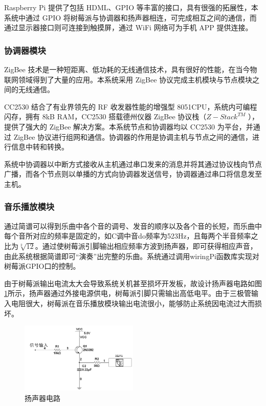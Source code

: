 \begin{spacing}{1.2}
    Raspberry Pi 提供了包括 HDML、GPIO 等丰富的接口，具有很强的拓展性，本系统中通过 GPIO 将树莓派与协调器和扬声器相连，可完成相互之间的通信，而通过显示器接口则可连接到触摸屏，通过 WiFi 网络可为手机 APP 提供连接。

    \subsubsection{协调器模块}
    ZigBee 技术是一种短距离、低功耗的无线通信技术，具有很好的性能，在当今物联网领域得到了大量的应用\supercite{13}。本系统采用 ZigBee 协议完成主机模块与节点模块之间的无线通信。

    CC2530 结合了有业界领先的 RF 收发器性能的增强型 8051CPU，系统内可编程闪存，拥有 8kB RAM，CC2530 搭载德州仪器 ZigBee 协议栈（$Z-Stack^{TM}$ ），提供了强大的 ZigBee 解决方案。本系统节点和协调器均以 CC2530 为平台，并通过 ZigBee 协议进行组网和通信\supercite{14}。协调器的作用是协调主机与节点之间的通信，进行信息中转和转换。

    系统中协调器以中断方式接收从主机通过串口发来的消息并将其通过协议栈向节点广播，而各个节点则以单播的方式向协调器发送信号，协调器通过串口将信息发至主机。


    \subsubsection{音乐播放模块}
    通过简谱可以得到乐曲中各个音的调号、发音的顺序以及各个音的长短，而乐曲中每个音所对应的频率是固定的，如C调中音do频率为523Hz，且每两个半音频率之比为$\sqrt[2]{12}$。通过使树莓派引脚输出相应频率方波到扬声器，即可获得相应声音，由此系统根据简谱即可“演奏”出完整的乐曲。系统通过调用wiringPi函数库实现对树莓派GPIO口的控制。

    由于树莓派输出电流太大会导致系统关机甚至损坏开发板，故设计扬声器电路如图\ref{fig:yangshengqi}所示，扬声器通过外接电源供电，树莓派引脚只需输出高低电平。由于三极管输入电阻很大，树莓派在音乐播放模块输出电流很小，能够防止系统因电流过大而损坏。

\begin{figure}[htb]
    \centering
    {\includegraphics [width=0.5\textwidth]{./image/music.png}
    \caption{扬声器电路}
    \label{fig:yangshengqi}}
\end{figure}


\end{spacing}
